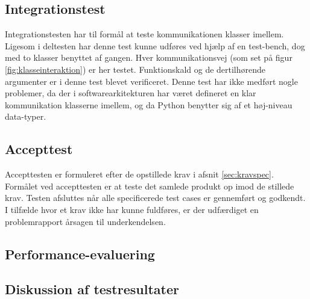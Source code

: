 \documentclass[rapport.tex]{subfiles}
\begin{document}
	\subsection{Integrationstest}
	Integrationstesten har til formål at teste kommunikationen klasser imellem.  Ligesom i deltesten har denne test kunne udføres ved hjælp af en test-bench, dog med to klasser benyttet af gangen. Hver kommunikationsvej (som set på figur \ref{fig:klasseinteraktion}) er her testet. Funktionskald og de dertilhørende argumenter er i denne test blevet verificeret. 
	Denne test har ikke medført nogle problemer, da der i softwarearkitekturen har været defineret en klar kommunikation klasserne imellem, og da Python benytter sig af et høj-niveau data-typer.
	
	\subsection{Accepttest}
	Accepttesten er formuleret efter de opstillede krav i afsnit \ref{sec:kravspec}. Formålet ved accepttesten er at teste det samlede produkt op imod de stillede krav. Testen afsluttes når alle specificerede test cases er gennemført og godkendt. I tilfælde hvor et krav ikke har kunne fuldføres, er der udfærdiget en problemrapport årsagen til underkendelsen. 
	
	\subsection{Performance-evaluering}
	\subsection{Diskussion af testresultater}
		
\end{document}
